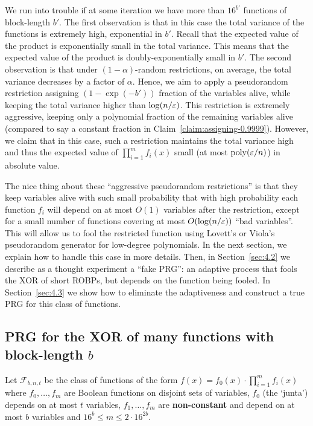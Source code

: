 We run into trouble if at some iteration we have more than $16^{b'}$ functions of block-length $b'$.
The first observation is that in this case the total variance of the functions is extremely high, exponential in $b'$. Recall that the expected value of the product is exponentially small in the total variance. This means that the expected value of the product is doubly-exponentially small in $b'$.
The second observation is that under $(1-\alpha)$-random restrictions, on average, the total variance decreases by a factor of $\alpha$.
Hence, we aim to apply a pseudorandom restriction assigning $(1-\exp(-b'))$ fraction of the variables alive, while keeping the total variance higher than $\log(n/\varepsilon)$. This restriction is extremely aggressive, keeping only a polynomial fraction of the remaining variables alive (compared to say a constant fraction in Claim~\ref{claim:assigning-0.9999}).
However, we claim that in this case, such a restriction maintains the total variance high and thus the expected value of $\prod_{i=1}^{m}{f_i(x)}$ small (at most ${\mathrm{poly}}(\varepsilon/n)$) in absolute value.

The nice thing about these ``aggressive pseudorandom restrictions'' is that they keep variables alive with such small probability that with high probability each function $f_i$ will depend on at most $O(1)$ variables after the restriction, except for a small number of functions covering at most $O(\log(n/\varepsilon))$ ``bad variables''. This will allow us to fool the restricted function using Lovett's \cite{Lovett08} or Viola's \cite{Viola08} pseudorandom generator for low-degree polynomials.
In the next section, we explain how to handle this case in more details. 
Then, in Section~\ref{sec:4.2} we describe as a thought experiment a ``fake PRG'': an adaptive process that fools the XOR of short ROBPs, but depends on the function being fooled. In Section~\ref{sec:4.3} we show how to eliminate the adaptiveness and construct a true PRG for this class of functions. 

\subsection{PRG for the XOR of many functions with block-length $b$}\label{sec:4.1}

Let $\mathcal{F}_{b,n,t}$ be the class of functions of the form
$f(x) = f_0(x) \cdot \prod_{i=1}^{m}{f_i(x)}$
where $f_0, \ldots, f_m$ are Boolean functions on disjoint sets of variables, $f_0$ (the `junta') depends on at most $t$ variables, $f_1, \ldots, f_m$ are {\bf non-constant} and depend on at most $b$ variables and 
$16^b \le m \le 2\cdot 16^{2b}$.

